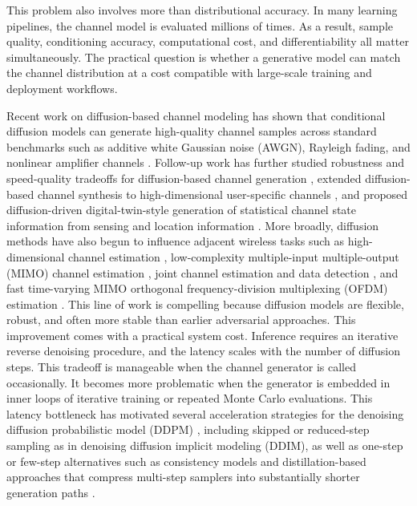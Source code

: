 \documentclass[10pt,journal]{IEEEtran}
\begin{document}
This problem also involves more than distributional accuracy.
In many learning pipelines, the channel model is evaluated millions of times.
As a result, sample quality, conditioning accuracy, computational cost, and differentiability all matter simultaneously.
The practical question is whether a generative model can match the channel distribution at a cost compatible with large-scale training and deployment workflows.

Recent work on diffusion-based channel modeling has shown that conditional diffusion models can generate high-quality channel samples across standard benchmarks such as additive white Gaussian noise (AWGN), Rayleigh fading, and nonlinear amplifier channels \cite{paper2309}.
Follow-up work has further studied robustness and speed-quality tradeoffs for diffusion-based channel generation \cite{kimicc2024}, extended diffusion-based channel synthesis to high-dimensional user-specific channels \cite{lee2024highdimchannels}, and proposed diffusion-driven digital-twin-style generation of statistical channel state information from sensing and location information \cite{gong2025dtoc}.
More broadly, diffusion methods have also begun to influence adjacent wireless tasks such as high-dimensional channel estimation \cite{zhou2025channelestimation}, low-complexity multiple-input multiple-output (MIMO) channel estimation \cite{fesl2024mimoestimation,chen2025mimovi}, joint channel estimation and data detection \cite{zilberstein2024joint}, and fast time-varying MIMO orthogonal frequency-division multiplexing (OFDM) estimation \cite{liu2025mimoofdm}.
This line of work is compelling because diffusion models are flexible, robust, and often more stable than earlier adversarial approaches.
This improvement comes with a practical system cost.
Inference requires an iterative reverse denoising procedure, and the latency scales with the number of diffusion steps.
This tradeoff is manageable when the channel generator is called occasionally.
It becomes more problematic when the generator is embedded in inner loops of iterative training or repeated Monte Carlo evaluations.
This latency bottleneck has motivated several acceleration strategies for the denoising diffusion probabilistic model (DDPM) \cite{ddpm}, including skipped or reduced-step sampling as in denoising diffusion implicit modeling (DDIM), as well as one-step or few-step alternatives such as consistency models and distillation-based approaches that compress multi-step samplers into substantially shorter generation paths \cite{ddim,song2023consistency,yin2024onestep}.
\end{document}

